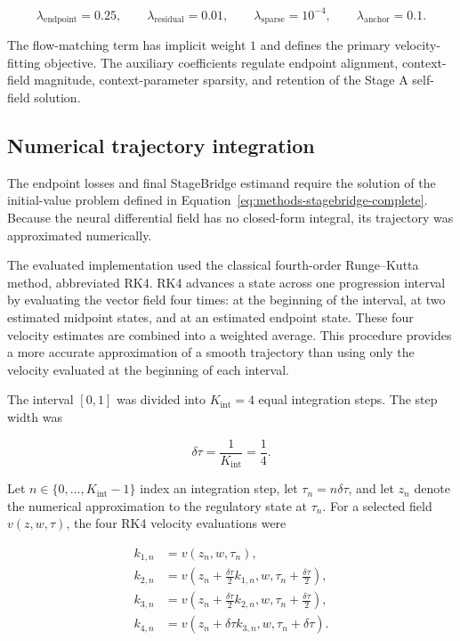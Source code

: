 \begin{equation}
\lambda_{\mathrm{endpoint}}=0.25,
\qquad
\lambda_{\mathrm{residual}}=0.01,
\qquad
\lambda_{\mathrm{sparse}}=10^{-4},
\qquad
\lambda_{\mathrm{anchor}}=0.1.
\label{appb-eq:methods-training-loss-weights}
\end{equation}

The flow-matching term has implicit weight \(1\) and defines the primary
velocity-fitting objective. The auxiliary coefficients regulate endpoint
alignment, context-field magnitude, context-parameter sparsity, and retention
of the Stage A self-field solution.

\subsection{Numerical trajectory integration}
\label{appb-sec:methods-training-integration}

The endpoint losses and final StageBridge estimand require the solution of the
initial-value problem defined in
Equation~\ref{eq:methods-stagebridge-complete}. Because the neural differential
field has no closed-form integral, its trajectory was approximated
numerically.

The evaluated implementation used the classical fourth-order Runge--Kutta
method, abbreviated RK4. RK4 advances a state across one progression interval
by evaluating the vector field four times: at the beginning of the interval,
at two estimated midpoint states, and at an estimated endpoint state. These
four velocity estimates are combined into a weighted average. This procedure
provides a more accurate approximation of a smooth trajectory than using only
the velocity evaluated at the beginning of each interval.

The interval \([0,1]\) was divided into
\(K_{\mathrm{int}}=4\) equal integration steps. The step width was

\begin{equation}
\delta\tau
=
\frac{1}{K_{\mathrm{int}}}
=
\frac{1}{4}.
\label{appb-eq:methods-rk4-step-width}
\end{equation}

Let \(n\in\{0,\ldots,K_{\mathrm{int}}-1\}\) index an integration step,
let \(\tau_n=n\delta\tau\), and let \(z_n\) denote the numerical approximation
to the regulatory state at \(\tau_n\). For a selected field
\(v(z,w,\tau)\), the four RK4 velocity evaluations were

\begin{equation}
\begin{aligned}
k_{1,n}
&=
v\left(z_n,w,\tau_n\right),
\\
k_{2,n}
&=
v\left(
z_n+\frac{\delta\tau}{2}k_{1,n},
w,
\tau_n+\frac{\delta\tau}{2}
\right),
\\
k_{3,n}
&=
v\left(
z_n+\frac{\delta\tau}{2}k_{2,n},
w,
\tau_n+\frac{\delta\tau}{2}
\right),
\\
k_{4,n}
&=
v\left(
z_n+\delta\tau k_{3,n},
w,
\tau_n+\delta\tau
\right).
\end{aligned}
\label{appb-eq:methods-rk4-slopes}
\end{equation}

